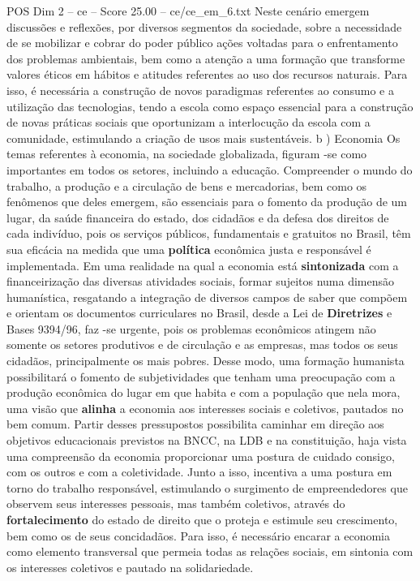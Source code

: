 \begin{textsample}{POS Dim 2 – ce – Score 25.00 – ce/ce\_em\_6.txt}
Neste cenário emergem discussões e reflexões, por diversos segmentos da sociedade, sobre a necessidade de se mobilizar e cobrar do poder público ações voltadas para o enfrentamento dos problemas ambientais, bem como a atenção a uma formação que transforme valores éticos em hábitos e atitudes referentes ao uso dos recursos naturais.
Para isso, é necessária a construção de novos paradigmas referentes ao consumo e a utilização das tecnologias, tendo a escola como espaço essencial para a construção de novas práticas sociais que oportunizam a interlocução da escola com a comunidade, estimulando a criação de usos mais sustentáveis. b ) Economia Os temas referentes à economia, na sociedade globalizada, figuram -se como importantes em todos os setores, incluindo a educação.
Compreender o mundo do trabalho, a produção e a circulação de bens e mercadorias, bem como os fenômenos que deles emergem, são essenciais para o fomento da produção de um lugar, da saúde financeira do estado, dos cidadãos e da defesa dos direitos de cada indivíduo, pois os serviços públicos, fundamentais e gratuitos no Brasil, têm sua eficácia na medida que uma \textbf{política} econômica justa e responsável é implementada.
Em uma realidade na qual a economia está \textbf{sintonizada} com a financeirização das diversas atividades sociais, formar sujeitos numa dimensão humanística, resgatando a integração de diversos campos de saber que compõem e orientam os documentos curriculares no Brasil, desde a Lei de \textbf{Diretrizes} e Bases 9394/96, faz -se urgente, pois os problemas econômicos atingem não somente os setores produtivos e de circulação e as empresas, mas todos os seus cidadãos, principalmente os mais pobres.
Desse modo, uma formação humanista possibilitará o fomento de subjetividades que tenham uma preocupação com a produção econômica do lugar em que habita e com a população que nela mora, uma visão que \textbf{alinha} a economia aos interesses sociais e coletivos, pautados no bem comum.
Partir desses pressupostos possibilita caminhar em direção aos objetivos educacionais previstos na BNCC, na LDB e na constituição, haja vista uma compreensão da economia proporcionar uma postura de cuidado consigo, com os outros e com a coletividade.
Junto a isso, incentiva a uma postura em torno do trabalho responsável, estimulando o surgimento de empreendedores que observem seus interesses pessoais, mas também coletivos, através do \textbf{fortalecimento} do estado de direito que o proteja e estimule seu crescimento, bem como os de seus concidadãos.
Para isso, é necessário encarar a economia como elemento transversal que permeia todas as relações sociais, em sintonia com os interesses coletivos e pautado na solidariedade.

\end{textsample}
